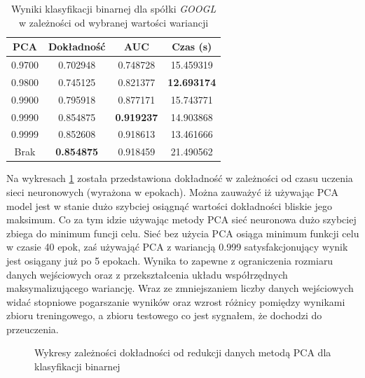 \documentclass[a4paper, twoside, 11pt, openright]{article}
\begin{document}
\begin{table}[H]
    \centering
    \begin{tabular}{|c|c|c|c|}
    \hline
        \textbf{PCA} & \textbf{Dokładność} &  \textbf{AUC} &  \textbf{Czas (s)} \\ \hline
0.9700               &  0.702948 &  0.748728 &   15.459319 \\ \hline
0.9800               &  0.745125 &  0.821377 &   \textbf{12.693174} \\ \hline
0.9900               &  0.795918 &  0.877171 &   15.743771 \\ \hline
0.9990           &  0.854875 &  \textbf{0.919237} &   14.903868 \\ \hline
0.9999             &  0.852608 &  0.918613 &   13.461666 \\ \hline
Brak                &  \textbf{0.854875} &  0.918459 &   21.490562 \\ \hline

    \end{tabular}
    \caption{Wyniki klasyfikacji binarnej dla spółki \textit{GOOGL} w zależności od wybranej wartości wariancji}
    \label{tab:nn_pca_binary}
\end{table}

Na wykresach \ref{img:nn_pca_binary_vs_accuracy} została przedstawiona dokładność w zależności od czasu uczenia sieci neuronowych (wyrażona w epokach). Można zauważyć iż używając PCA model jest w stanie dużo szybciej osiągnąć wartości dokładności bliskie jego maksimum. Co za tym idzie używając metody PCA sieć neuronowa dużo szybciej zbiega do minimum funcji celu. Sieć bez użycia PCA osiąga minimum funkcji celu w czasie 40 epok, zaś używająć PCA z wariancją 0.999 satysfakcjonujący wynik jest osiągany już po 5 epokach. Wynika to zapewne z ograniczenia rozmiaru danych wejściowych oraz z przekształcenia układu współrzędnych maksymalizującego wariancję. Wraz ze zmniejszaniem liczby danych wejściowych widać stopniowe pogarszanie wyników oraz wzrost różnicy pomiędzy wynikami zbioru treningowego, a zbioru testowego co jest sygnałem, że dochodzi do przeuczenia.


\begin{figure}[H]%
\centering
{}%
\qquad
{}%
\qquad
{}%
\qquad
{}%

\caption{Wykresy zależności dokładności od redukcji danych metodą PCA dla klasyfikacji binarnej}
\label{img:nn_pca_binary_vs_accuracy}
\end{figure}
\end{document}
